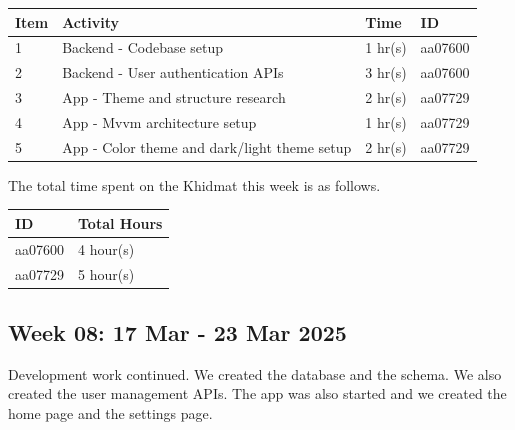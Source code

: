 \documentclass[12pt,a4paper]{article}
\begin{document}
\begin{center}
    \bigskip
    \begin{tabular}{|l|l|l|l|}
        \hline
        Item 	& Activity & Time & ID \\\hline\hline
        1	& Backend - Codebase setup & 1 hr(s) & aa07600 \\\hline
        2	& Backend - User authentication APIs & 3 hr(s) & aa07600 \\\hline\hline
        3	& App - Theme and structure research & 2 hr(s) & aa07729 \\\hline
        4	& App - Mvvm architecture setup & 1 hr(s) & aa07729 \\\hline
        5	& App - Color theme and dark/light theme setup & 2 hr(s) & aa07729 \\\hline
    \end{tabular}

    \bigskip
    The total time spent on the Khidmat this week is as follows.

    \bigskip
    \begin{tabular}{|l|l|}
        \hline
        ID & Total Hours\\\hline\hline
        aa07600 & 4 hour(s)\\\hline
        aa07729 & 5 hour(s)\\\hline
    \end{tabular}
\end{center}

\newpage

\subsection{Week 08: 17 Mar - 23 Mar 2025}
Development work continued. We created the database and the schema. We also created the user management APIs. The app was also started and we created the home page and the settings page.
\end{document}

